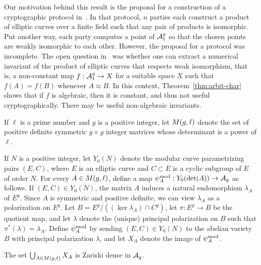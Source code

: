 \documentclass{amsart}
\begin{document}
Our motivation behind this result is the proposal for a construction of a cryptographic protocol in~\cite{multiparty}. In that protocol, $n$ parties each construct a product of elliptic curves over a finite field such that any pair of products is isomorphic. Put another way, each party computes a point of $\mathcal{A}_1^g$ so that the chosen points are weakly isomorphic to each other. However, the proposal for a protocol was incomplete. The open question in~\cite{multiparty} was whether one can extract a numerical invariant of the product of elliptic curves that respects weak isomorphism, that is, a non-constant map $f: \mathcal{A}_1^g \to X$ for a suitable space $X$ such that $f(A) = f(B)$ whenever $A \approx B$. In this context, Theorem~\ref{thm:arbit-char} shows that if $f$ is algebraic, then it is constant, and thus not useful cryptographically. There may be useful non-algebraic invariants. %


\begin{definition}\label{def:detl}
If $\ell$ is a prime number and $g$ is a positive integer, let $M(g,\ell)$ denote the set of positive definite symmetric $g \times g$ integer matrices whose determinant is a power of $\ell$.
\end{definition}

If $N$ is a positive integer, let $Y_0(N)$ denote the modular curve parametrizing pairs $(E, C)$, where $E$ is an elliptic curve and $C \subset E$ is a cyclic subgroup of $E$ of order $N$. For every $A \in M(g,\ell)$, define a map $\psi_{A}^\mathrm{mod}: Y_0(\det(A)) \to \mathcal{A}_g$ as follows. If $(E, C) \in Y_0(N)$, the matrix $A$ induces a natural endomorphism $\lambda_A$ of $E^g$. Since $A$ is symmetric and positive definite, we can view $\lambda_A$ as a polarization on $E^g$. Let $B = E^g/((\ker \lambda_A) \cap C^g)$, let $\pi: E^g \to B$ be the quotient map, and let $\lambda$ denote the (unique) principal polarization on $B$ such that $\pi^*(\lambda) = \lambda_A$. Define $\psi_{A}^\mathrm{mod}$ by sending $(E,C) \in Y_0(N)$ to the abelian variety $B$ with principal polarization $\lambda$, and let $X_A$ denote the image of $\psi_{A}^\mathrm{mod}$.

\begin{theorem}\label{thm:curves-dense}
  The set $\bigcup_{A \in M(g,\ell)} X_A$ is Zariski dense in $\mathcal{A}_g$.
\end{theorem}
\end{document}
